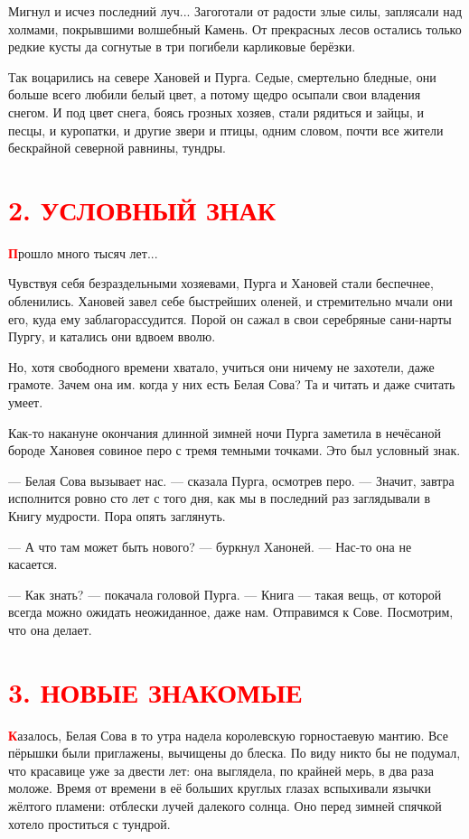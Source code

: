 \documentclass[oneside,final,14pt]{extreport}
\begin{document}
	Мигнул и исчез последний луч... Загоготали от радости злые силы, заплясали над холмами, покрывшими волшебный Камень. От прекрасных лесов остались только редкие кусты да согнутые в три погибели карликовые берёзки.
	
	Так воцарились на севере Хановей и Пурга. Седые, смертельно бледные, они больше всего любили белый цвет, а потому щедро осыпали свои владения снегом. И под цвет снега, боясь грозных хозяев, стали рядиться и зайцы, и песцы, и куропатки, и другие звери и птицы, одним словом, почти все жители бескрайной северной равнины, тундры.
	
		\section[2. Условный знак]{\center \textcolor{red}{2. УСЛОВНЫЙ ЗНАК}}
	
	\lettrine[findent=0pt]{\textbf{\textcolor{red}{П}}}{}рошло много тысяч лет...
	
	\qquad	Чувствуя себя безраздельными хозяевами, Пурга и Хановей стали беспечнее, обленились. Хановей завел себе быстрейших оленей, и стремительно мчали они его, куда ему заблагорассудится. Порой он сажал в свои серебряные сани-нарты Пургу, и катались они вдвоем вволю.
	
	Но, хотя свободного времени хватало, учиться они ничему не захотели, даже грамоте. Зачем она им. когда у них есть Белая Сова? Та и читать и даже считать умеет.
	
	Как-то накануне окончания длинной зимней ночи Пурга заметила в нечёсаной бороде Хановея совиное перо с тремя темными точками. Это был условный знак.
	
	— Белая Сова вызывает нас. — сказала Пурга, осмотрев перо. — Значит, завтра исполнится ровно сто лет с того дня, как мы в последний раз заглядывали в Книгу мудрости. Пора опять заглянуть.
	
	— А что там может быть нового? — буркнул Ханоней. — Нас-то она не касается.
	
	— Как знать? — покачала головой Пурга. — Книга — такая вещь, от которой всегда можно ожидать неожиданное, даже нам. Отправимся к Сове. Посмотрим, что она делает.
	
		\section[3. Новые знакомые]{\center \textcolor{red}{3. НОВЫЕ ЗНАКОМЫЕ}}

	\lettrine[findent=0pt]{\textbf{\textcolor{red}{К}}}{}азалось, Белая Сова в то утра надела королевскую горностаевую мантию. Все пёрышки были приглажены, вычищены до блеска. По виду никто бы не подумал, что красавице уже за двести лет: она выглядела, по крайней мерь, в два раза моложе. Время от времени в её больших круглых глазах вспыхивали язычки жёлтого пламени: отблески лучей далекого солнца. Оно перед зимней спячкой хотело проститься с тундрой.
	
\end{document}
